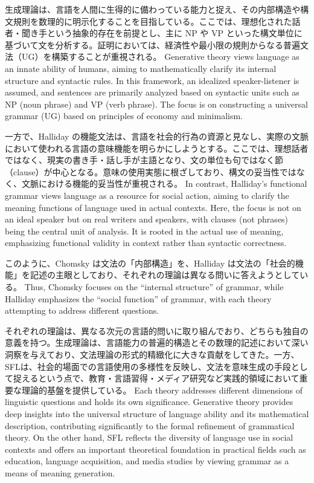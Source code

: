 \ifJPN
生成理論は、言語を人間に生得的に備わっている能力と捉え、その内部構造や構文規則を数理的に明示化することを目指している。ここでは、理想化された話者・聞き手という抽象的存在を前提とし、主に NP や VP といった構文単位に基づいて文を分析する。証明においては、経済性や最小限の規則からなる普遍文法（UG）を構築することが重視される。
\else
Generative theory views language as an innate ability of humans, aiming to mathematically clarify its internal structure and syntactic rules. In this framework, an idealized speaker-listener is assumed, and sentences are primarily analyzed based on syntactic units such as NP (noun phrase) and VP (verb phrase). The focus is on constructing a universal grammar (UG) based on principles of economy and minimalism.
\fi

\ifJPN
一方で、Halliday の機能文法は、言語を社会的行為の資源と見なし、実際の文脈において使われる言語の意味機能を明らかにしようとする。ここでは、理想話者ではなく、現実の書き手・話し手が主語となり、文の単位も句ではなく節（clause）が中心となる。意味の使用実態に根ざしており、構文の妥当性ではなく、文脈における機能的妥当性が重視される。
\else
In contrast, Halliday's functional grammar views language as a resource for social action, aiming to clarify the meaning functions of language used in actual contexts. Here, the focus is not on an ideal speaker but on real writers and speakers, with clauses (not phrases) being the central unit of analysis. It is rooted in the actual use of meaning, emphasizing functional validity in context rather than syntactic correctness.
\fi

\ifJPN
このように、Chomsky は文法の「内部構造」を、Halliday は文法の「社会的機能」を記述の主眼としており、それぞれの理論は異なる問いに答えようとしている。
\else
Thus, Chomsky focuses on the ``internal structure'' of grammar, while Halliday emphasizes the ``social function'' of grammar, with each theory attempting to address different questions.
\fi

\ifJPN
それぞれの理論は、異なる次元の言語的問いに取り組んでおり、どちらも独自の意義を持つ。生成理論は、言語能力の普遍的構造とその数理的記述において深い洞察を与えており、文法理論の形式的精緻化に大きな貢献をしてきた。一方、SFLは、社会的場面での言語使用の多様性を反映し、文法を意味生成の手段として捉えるという点で、教育・言語習得・メディア研究など実践的領域において重要な理論的基盤を提供している。
\else
Each theory addresses different dimensions of linguistic questions and holds its own significance. Generative theory provides deep insights into the universal structure of language ability and its mathematical description, contributing significantly to the formal refinement of grammatical theory. On the other hand, SFL reflects the diversity of language use in social contexts and offers an important theoretical foundation in practical fields such as education, language acquisition, and media studies by viewing grammar as a means of meaning generation.
\fi

